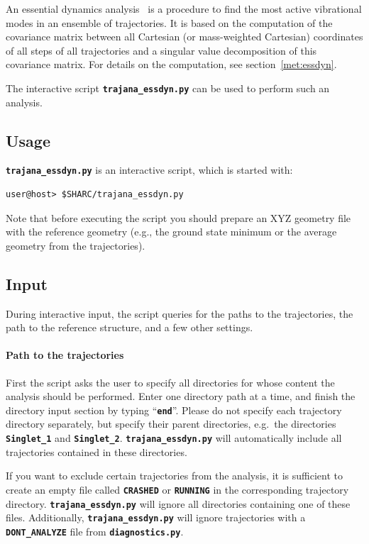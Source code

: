 \documentclass[a4paper,10pt,DIV=15,openany]{scrbook}
\newcommand{\ttt}[1]{\textbf{\texttt{#1}}}
\begin{document}
An essential dynamics analysis~\cite{Amadei1993PSFB} is a procedure to find the most active vibrational modes in an ensemble of trajectories.
It is based on the computation of the covariance matrix between all Cartesian (or mass-weighted Cartesian) coordinates of all steps of all trajectories and a singular value decomposition of this covariance matrix.
For details on the computation, see section~\ref{met:essdyn}.

The interactive script \ttt{trajana\_essdyn.py} can be used to perform such an analysis.

\subsection{Usage}

\ttt{trajana\_essdyn.py} is an interactive script, which is started with:
\begin{verbatim}
user@host> $SHARC/trajana_essdyn.py
\end{verbatim}
Note that before executing the script you should prepare an XYZ geometry file with the reference geometry (e.g., the ground state minimum or the average geometry from the trajectories).

\subsection{Input}

During interactive input, the script queries for the paths to the trajectories, the path to the reference structure, and a few other settings.

\paragraph{Path to the trajectories}

First the script asks the user to specify all directories for whose content the analysis should be performed. Enter one directory path at a time, and finish the directory input section by typing ``\ttt{end}''. Please do not specify each trajectory directory separately, but specify their parent directories, e.g.\ the directories \ttt{Singlet\_1} and \ttt{Singlet\_2}. \ttt{trajana\_essdyn.py} will automatically include all trajectories contained in these directories.

If you want to exclude certain trajectories from the analysis, it is sufficient to create an empty file called \ttt{CRASHED} or \ttt{RUNNING} in the corresponding trajectory directory. \ttt{trajana\_essdyn.py} will ignore all directories containing one of these files.
Additionally, \ttt{trajana\_essdyn.py} will ignore trajectories with a \ttt{DONT\_ANALYZE} file from \ttt{diagnostics.py}.
\end{document}
